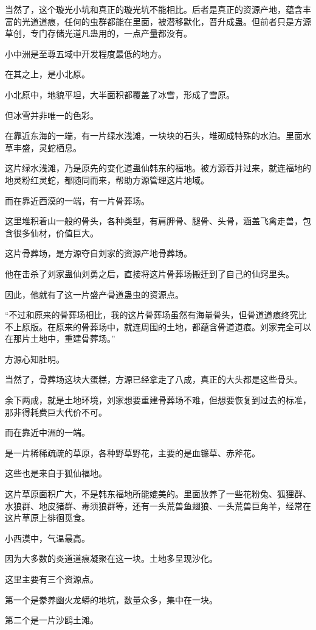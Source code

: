 \begin{this_body}
当然了，这个璇光小坑和真正的璇光坑不能相比。后者是真正的资源产地，蕴含丰富的光道道痕，任何的虫群都能在里面，被潜移默化，晋升成蛊。但前者只是方源草创，专门存储光道凡蛊用的，一点产量都没有。

小中洲是至尊五域中开发程度最低的地方。

在其之上，是小北原。

小北原中，地貌平坦，大半面积都覆盖了冰雪，形成了雪原。

但冰雪并非唯一的色彩。

在靠近东海的一端，有一片绿水浅滩，一块块的石头，堆砌成特殊的水泊。里面水草丰盛，灵蛇栖息。

这片绿水浅滩，乃是原先的变化道蛊仙韩东的福地。被方源吞并过来，就连福地的地灵粉红灵蛇，都随同而来，帮助方源管理这片地域。

而在靠近西漠的一端，有一片骨葬场。

这里堆积着山一般的骨头，各种类型，有肩胛骨、腿骨、头骨，涵盖飞禽走兽，包含很多仙材，价值巨大。

这片骨葬场，是方源夺自刘家的资源产地骨葬场。

他在击杀了刘家蛊仙刘勇之后，直接将这片骨葬场搬迁到了自己的仙窍里头。

因此，他就有了这一片盛产骨道蛊虫的资源点。

“不过和原来的骨葬场相比，我的这片骨葬场虽然有海量骨头，但骨道道痕终究比不上原版。在原来的骨葬场中，就连周围的土地，都蕴含骨道道痕。刘家完全可以在那片土地中，重建骨葬场。”

方源心知肚明。

当然了，骨葬场这块大蛋糕，方源已经拿走了八成，真正的大头都是这些骨头。

余下两成，就是土地环境，刘家想要重建骨葬场不难，但想要恢复到过去的标准，那非得耗费巨大代价不可。

而在靠近中洲的一端。

是一片稀稀疏疏的草原，各种野草野花，主要的是血镰草、赤斧花。

这些也是来自于狐仙福地。

这片草原面积广大，不是韩东福地所能媲美的。里面放养了一些花粉兔、狐狸群、水狼群、地皮猪群、毒须狼群等，还有一头荒兽鱼翅狼、一头荒兽巨角羊，经常在这片草原上徘徊觅食。

小西漠中，气温最高。

因为大多数的炎道道痕凝聚在这一块。土地多呈现沙化。

这里主要有三个资源点。

第一个是豢养幽火龙蟒的地坑，数量众多，集中在一块。

第二个是一片沙鸥土滩。


\end{this_body}

